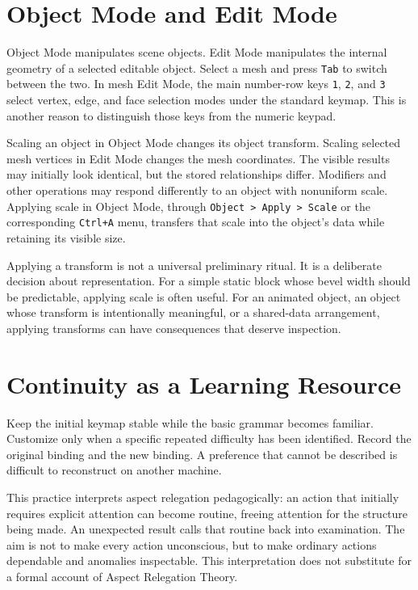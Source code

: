 \documentclass[11pt,openany]{book}
\newcommand{\key}[1]{\texttt{#1}}
\begin{document}
\section{Object Mode and Edit Mode}

Object Mode manipulates scene objects. Edit Mode manipulates the internal geometry of a selected editable object. Select a mesh and press \key{Tab} to switch between the two. In mesh Edit Mode, the main number-row keys \key{1}, \key{2}, and \key{3} select vertex, edge, and face selection modes under the standard keymap. This is another reason to distinguish those keys from the numeric keypad.

Scaling an object in Object Mode changes its object transform. Scaling selected mesh vertices in Edit Mode changes the mesh coordinates. The visible results may initially look identical, but the stored relationships differ. Modifiers and other operations may respond differently to an object with nonuniform scale. Applying scale in Object Mode, through \texttt{Object > Apply > Scale} or the corresponding \key{Ctrl+A} menu, transfers that scale into the object's data while retaining its visible size.

Applying a transform is not a universal preliminary ritual. It is a deliberate decision about representation. For a simple static block whose bevel width should be predictable, applying scale is often useful. For an animated object, an object whose transform is intentionally meaningful, or a shared-data arrangement, applying transforms can have consequences that deserve inspection.

\section{Continuity as a Learning Resource}

Keep the initial keymap stable while the basic grammar becomes familiar. Customize only when a specific repeated difficulty has been identified. Record the original binding and the new binding. A preference that cannot be described is difficult to reconstruct on another machine.

This practice interprets aspect relegation pedagogically: an action that initially requires explicit attention can become routine, freeing attention for the structure being made. An unexpected result calls that routine back into examination. The aim is not to make every action unconscious, but to make ordinary actions dependable and anomalies inspectable. This interpretation does not substitute for a formal account of Aspect Relegation Theory.
\end{document}
